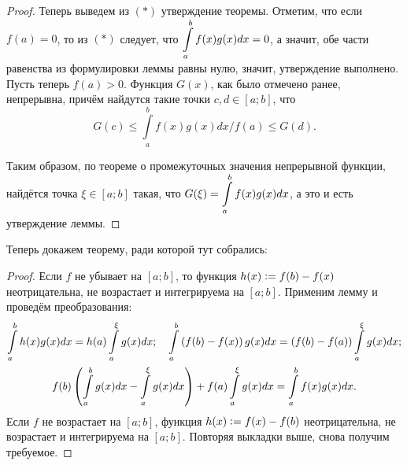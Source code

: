 \begin{proof}
    Теперь выведем из $(\ast)$ утверждение теоремы. Отметим, что если $f(a) = 0$, то из $(\ast)$ следует, что $\displaystyle\int\limits_a^bf(x)g(x)dx = 0$, а значит, обе части равенства из формулировки леммы равны нулю, значит, утверждение выполнено. Пусть теперь $f(a) > 0$. Функция $G(x)$, как было отмечено ранее, непрерывна, причём найдутся такие точки $c, d \in [a; b]$, что
    \[
        G(c) \leqslant \int\limits_a^bf(x)g(x)dx \bigg/f(a) \leqslant G(d).
    \]

    Таким образом, по теореме о промежуточных значения непрерывной функции, найдётся точка $\xi \in [a; b]$ такая, что $\displaystyle G(\xi) = \int\limits_a^bf(x)g(x)dx$, а это и есть утверждение леммы.
\end{proof}

Теперь докажем теорему, ради которой тут собрались:

\begin{proof}
    Если $f$ не убывает на $[a; b]$, то функция $h(x) \vcentcolon = f(b) - f(x)$ неотрицательна, не возрастает и интегрируема на $[a; b]$. Применим лемму и проведём преобразования:
    \begin{gather*}
        \int\limits_a^bh(x)g(x)dx = h(a)\int\limits_a^\xi g(x)dx;\quad\int\limits_a^b\left(f(b) - f(x)\right)g(x)dx = \left(f(b) - f(a)\right)\int\limits_a^\xi g(x)dx;\\
        f(b)\left(\int\limits_a^bg(x)dx - \int\limits_a^\xi g(x)dx\right) + f(a)\int\limits_a^\xi g(x)dx = \int\limits_a^bf(x)g(x)dx.
    \end{gather*}
    Если $f$ не возрастает на $[a; b]$, функция $h(x) \vcentcolon = f(x) - f(b)$ неотрицательна, не возрастает и интегрируема на $[a; b]$. Повторяя выкладки выше, снова получим требуемое.
\end{proof}

